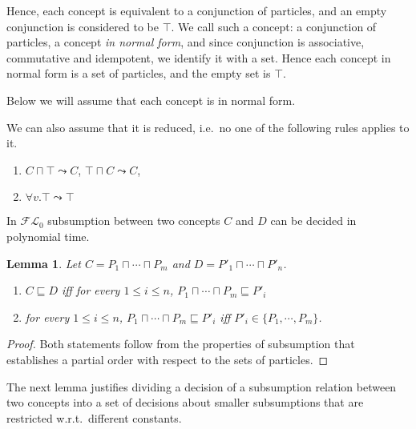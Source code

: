 \documentclass{article}
\newtheorem{lemma}{Lemma}
\newcommand{\flo}{\ensuremath{\mathcal{FL}_0}\xspace}
\newcommand{\wrt}{w.r.t.\ }
\newcommand{\ie}{i.e.\ }
\begin{document}
Hence, each concept is equivalent to a conjunction of particles, and an empty conjunction is considered to be $\top$. We call such a concept: a conjunction of particles, a concept \emph{in normal form}, and
since conjunction is associative, commutative and idempotent, we identify it with a set.
Hence each concept in normal form is a set of particles, and the empty set is $\top$.

Below we will assume that each concept is in normal form.

We can also assume that it is reduced, \ie no one of the following rules applies to it.
\begin{enumerate}
	\item $C \sqcap \top \leadsto C$, $\top \sqcap C \leadsto C$,
	\item $\forall v.\top \leadsto \top$
\end{enumerate}

In \flo subsumption between two concepts $C$ and $D$ can be decided in polynomial time.
\begin{lemma}\label{lemma:subsumption} Let  $C=P_1 \sqcap \cdots\sqcap P_m$ and $D=P'_1 \sqcap \cdots \sqcap P'_n$.
	\begin{enumerate}
\item 	$C \sqsubseteq D $ iff for every  $1 \le i \le n$,  $P_1 \sqcap \cdots\sqcap P_m \sqsubseteq P'_i$
\item for every $1 \le i \le n$,  $P_1 \sqcap \cdots\sqcap P_m \sqsubseteq P'_i$ iff 
$P'_i \in \{P_1, \cdots, P_m\}$.
\end{enumerate}
\end{lemma}
\begin{proof}
	Both statements follow from the properties of subsumption that establishes a partial order with respect to the sets of particles.
\end{proof}

The next lemma justifies dividing a decision of a subsumption relation between two concepts into a set of decisions about smaller subsumptions that are restricted \wrt different constants.
\end{document}
